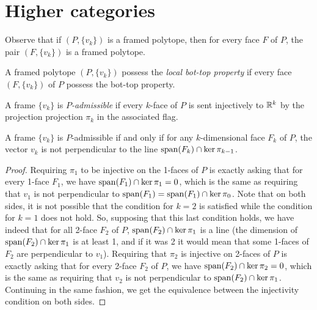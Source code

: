
\section{Higher categories}

Observe that if $(P,\{v_k\})$ is a framed polytope, then for every face $F$ of $P$, the pair $(F,\{v_k\})$ is a framed polytope.

\begin{definition}
	A framed polytope $(P,\{v_k\})$ possess the \emph{local bot-top property} if every face $(F,\{v_k\})$ of $P$ possess the bot-top property.
\end{definition}

\begin{definition}
	A frame $\{v_k\}$ is \emph{$P$-admissible} if every $k$-face of $P$ is sent injectively to $\mathbb{R}^k$ by the projection projection $\pi_k$ in the associated flag. 
\end{definition}

\begin{proposition}
	\label{prop:P-admissible}
	A frame $\{v_k\}$ is $P$-admissible if and only if for any $k$-dimensional face $F_k$ of $P$, the vector $v_k$ is not perpendicular to the line $\operatorname{\mathrm{span}}(F_k) \cap \ker \pi_{k-1}$.
\end{proposition}

\begin{proof}
	Requiring $\pi_1$ to be injective on the 1-faces of $P$ is exactly asking that for every 1-face $F_1$, we have $\operatorname{\mathrm{span}}(F_1)\cap \ker \pi_1=0$, which is the same as requiring that $v_1$ is not perpendicular to $\operatorname{\mathrm{span}}(F_1)=\operatorname{\mathrm{span}}(F_1)\cap \ker \pi_0$.
	Note that on both sides, it is not possible that the condition for $k=2$ is satisfied while the condition for $k=1$ does not hold.
	So, supposing that this last condition holds, we have indeed that for all 2-face $F_2$ of $P$, $\operatorname{\mathrm{span}}(F_2)\cap \ker \pi_1$ is a line (the dimension of $\operatorname{\mathrm{span}}(F_2)\cap \ker \pi_1$ is at least 1, and if it was 2 it would mean that some 1-faces of $F_2$ are perpendicular to $v_1$).
	Requiring that $\pi_2$ is injective on 2-faces of $P$ is exactly asking that for every 2-face $F_2$ of $P$, we have $\operatorname{\mathrm{span}}(F_2)\cap \ker \pi_2=0$, which is the same as requiring that $v_2$ is not perpendicular to $\operatorname{\mathrm{span}}(F_2)\cap \ker \pi_1$.
	Continuing in the same fashion, we get the equivalence between the injectivity condition on both sides.
\end{proof}

